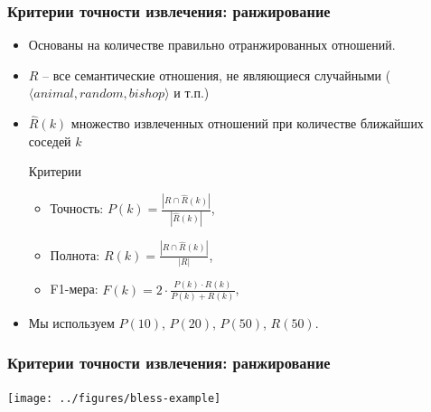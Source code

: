 \begin{frame}
\frametitle{Критерии точности извлечения: ранжирование}

\begin{itemize}
  
  \item Основаны на количестве \alert{правильно отранжированных} отношений.
  

\item $R$ -- все семантические отношения, не являющиеся случайными ($\langle animal, random, bishop \rangle$ и т.п.)

\item $\hat{R}(k)$ множество извлеченных отношений при количестве ближайших соседей $k$

\begin{block}{Критерии}

    
    \begin{itemize}
        \item Точность: $P(k)=$$\frac{|R \cap \hat{R}(k)|}{|\hat{R}(k)|}$,
        \item Полнота: $R(k)=$$\frac{|R \cap \hat{R}(k)|}{|R|}$,
        \item F1-мера: $F(k)= 2 \cdot \frac{P(k) \cdot R(k)}{P(k) + R(k)}$,
    \end{itemize}   
    \end{block}

\item Мы используем $P(10)$, $P(20)$, $P(50)$, $R(50)$.
    

\end{itemize}
    
    
\end{frame}


\begin{frame}
\frametitle{Критерии точности извлечения: ранжирование}

\begin{table}
\centering
\texttt{[image: ../figures/bless-example]}
\label{tbl:bless-example}
\end{table}
    
\end{frame}

